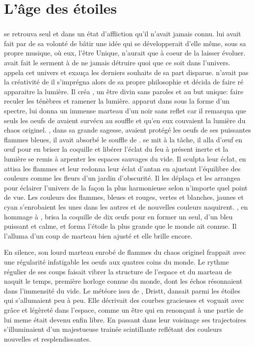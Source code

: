 \chapter{L'âge des étoiles}

\subsection{\Cind}

\Cind se retrouva seul et dans un état d'affliction qu'il n'avait jamais connu. \Mey lui avait fait par de sa volonté de bâtir une idée qui se développerait d'elle même, sous sa propre musique, où eux, l'être Unique, n'aurait que à coeur de la laisser évoluer. \Cind avait fait le serment à \Mey de ne jamais détruire quoi que ce soit dans l'univers. \Cind appela cet univers \dreyma et exauça les derniers souhaits de sa part disparue. \Cind n'avait pas la créativité de \Mey il s'imprégna alors de sa propre philosophie et décida de faire ré apparaitre la lumière. Il créa \carac, un être divin sans paroles et au but unique: faire reculer les ténèbres et ramener la lumière. \carac apparut dans \dreyma sous la forme d'un spectre, \Cind lui donna un immense marteau d'un noir sans reflet car il remarqua que seuls les oeufs de \Tot avaient survécu au souffle et qu'en eux couvaient la lumière du chaos originel. \Boromu, dans sa grande sagesse, avaient protégé les oeufs de ses puissantes flammes bleues, il avait absorbé le souffle de \Cind.  \carac se mit à la tâche, il alla d'œuf en œuf pour en briser la coquille et libérer l'éclat du feu à présent inerte et la lumière se remis à arpenter les espaces sauvages du vide. Il sculpta leur éclat, en attisa les flammes et leur redonna leur éclat d'antan en ajustant l'équilibre des couleurs comme les fleurs d'un jardin d'obscurité. Il les déplaça et les arrangea pour éclairer l'univers de la façon la plus harmonieuse selon n'importe quel point de vue. Les couleurs des flammes, bleues et rouges, vertes et blanches, jaunes et cyan s'enrobaient les unes dans les autres et de nouvelles couleurs naquirent. \carac, en hommage à \Boromu, brisa la coquille de dix œufs pour en former un seul, d'un bleu puissant et calme, et forma l'étoile la plus grande que le monde ait connue. Il l'alluma d'un coup de marteau bien ajusté et elle brille encore. 

En silence, son lourd marteau enrobé de flammes du chaos originel frappait avec une régularité infatigable les oeufs aux quatres coins du monde. Le rythme régulier de ses coups faisait vibrer la structure de l'espace et du marteau de \carac naquit le temps, première horloge connue du monde, dont les échos résonnaient dans l'immensité du vide. Le météore issu de \Mey, Dristt, dansait parmi les étoiles qui s'allumaient peu à peu. Elle décrivait des courbes gracieuses et voguait avec grâce et légèreté dans l'espace, comme un être qui en renonçant à une partie de lui meme était devenu enfin libre. En passant dans leur voisinage ses trajectoires s'illuminaient d'un majestueuse trainée scintillante reflétant des couleurs nouvelles et resplendissantes.


